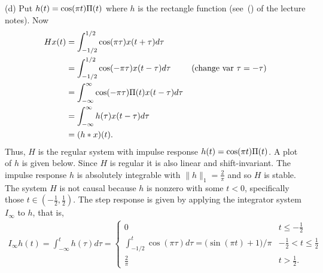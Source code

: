 \begin{excersizelist}
\begin{solution}
(d) Put $h(t) = \cos(\pi t) \Pi(t)$ where $h$ is the rectangle function (see~() of the lecture notes).  Now
\begin{align*}
Hx(t) &= \int_{-1/2}^{1/2} \cos(\pi\tau) x(t + \tau) d\tau \\
&=\int_{-1/2}^{1/2} \cos(-\pi\tau) x(t - \tau) d\tau & \text{(change var $\tau=-\tau$)}\\
&=\int_{-\infty}^{\infty} \cos(-\pi\tau)\Pi(t) x(t - \tau) d\tau \\
&=\int_{-\infty}^{\infty} h(\tau) x(t - \tau) d\tau \\
&= (h*x)(t).
\end{align*}
Thus, $H$ is the regular system with impulse response $h(t) = \cos(\pi t) \Pi(t)$.  A plot of $h$ is given below.  Since $H$ is regular it is also linear and shift-invariant.  The impulse response $h$ is absolutely  integrable with $\|h\|_1 = \tfrac{2}{\pi}$ and so $H$ is stable.  The system $H$ is not causal because $h$ is nonzero with some $t < 0$, specifically those $t \in (-\tfrac{1}{2},\tfrac{1}{2})$.  The step response is given by applying the integrator system $I_\infty$ to $h$, that is, 
\begin{align*}
I_\infty h(t) = \int_{-\infty}^t h(\tau) d\tau = \begin{cases}
0 & t \leq -\tfrac{1}{2} \\
\int_{-1/2}^t \cos(\pi\tau) d\tau = \big(\sin(\pi t) + 1\big)/\pi & -\tfrac{1}{2} < t \leq \tfrac{1}{2} \\
\tfrac{2}{\pi} & t > \tfrac{1}{2}.
\end{cases}
\end{align*}


\end{solution}
\end{excersizelist}
